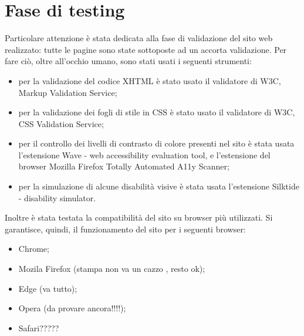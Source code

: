 \section{Fase di testing}
Particolare attenzione è stata dedicata alla fase di validazione del sito web realizzato: tutte le pagine sono state sottoposte ad un accorta validazione. Per fare ciò, oltre all'occhio umano, sono stati usati i seguenti strumenti: 
\begin{itemize}
	\item per la validazione del codice XHTML è stato usato il validatore di W3C, Markup Validation Service;
	\item per la validazione dei fogli di stile in CSS è stato usato il validatore di W3C, CSS Validation Service;
	\item per il controllo dei livelli di contrasto di colore presenti nel sito è stata usata l'estensione Wave - web accessibility evaluation tool, e l'estensione del browser Mozilla Firefox Totally Automated A11y Scanner;
	\item per la simulazione di alcune disabilità visive è stata usata l'estensione Silktide - disability simulator.
\end{itemize}
Inoltre è stata testata la compatibilità del sito su browser più utilizzati. Si garantisce, quindi, il funzionamento del sito per i seguenti browser:
\begin{itemize}
\item Chrome;
\item Mozila Firefox (stampa non va un cazzo , resto ok);
\item Edge (va tutto);
\item Opera (da provare ancora!!!!);
\item Safari?????
\end{itemize}